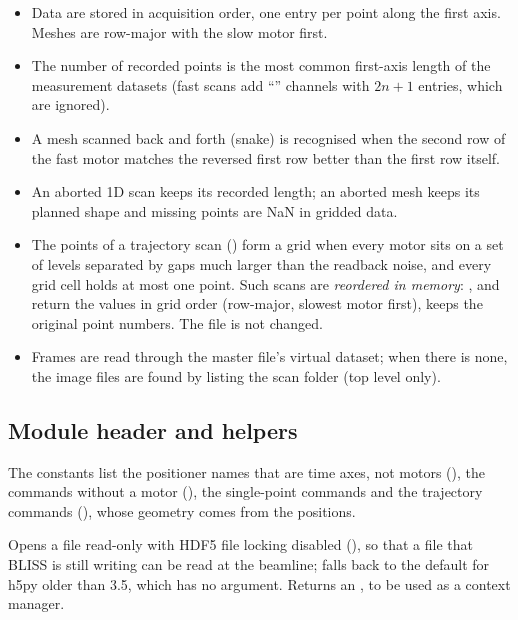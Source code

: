 \begin{hyp}
\begin{itemize}[nosep,leftmargin=1em]
\item Data are stored in acquisition order, one entry per point along the first axis.
  Meshes are row-major with the slow motor first.
\item The number of recorded points is the most common first-axis length of the measurement
  datasets (fast scans add ``'' channels with $2n+1$ entries, which are ignored).
\item A mesh scanned back and forth (snake) is recognised when the second row of the fast
  motor matches the reversed first row better than the first row itself.
\item An aborted 1D scan keeps its recorded length; an aborted mesh keeps its planned shape
  and missing points are NaN in gridded data.
\item The points of a trajectory scan () form a grid when every motor sits on
  a set of levels separated by gaps much larger than the readback noise, and every grid cell
  holds at most one point. Such scans are \emph{reordered in memory}: ,
   and  return the values in grid order (row-major, slowest
  motor first),  keeps the original point numbers. The file is not changed.
\item Frames are read through the master file's virtual dataset; when there is none, the
  image files are found by listing the scan folder (top level only).
\end{itemize}
\end{hyp}

\subsection{Module header and helpers}


The constants list the positioner names that are time axes, not motors (),
the commands without a motor (), the single-point commands and the
trajectory commands (), whose geometry comes from the positions.

Opens a file read-only with HDF5 file locking disabled (), so that a file
that BLISS is still writing can be read at the beamline; falls back to the default for
h5py older than 3.5, which has no  argument. Returns an , to be
used as a context manager.

